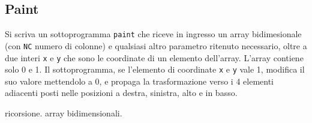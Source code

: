 \subsection{Paint}
Si scriva un sottoprogramma \texttt{paint} che riceve in ingresso un array bidimesionale (con \texttt{NC} numero di colonne) e qualsiasi altro parametro ritenuto necessario, oltre a due interi \texttt{x} e \texttt{y} che sono le coordinate di un elemento dell'array. L'array contiene solo 0 e 1. 
Il sottoprogramma, se l'elemento di coordinate \texttt{x} e \texttt{y} vale 1, modifica il suo valore mettendolo a 0, e propaga la trasformazione verso i 4 elementi adiacenti posti nelle posizioni a destra, sinistra, alto e in basso.

\begin{tags}
ricorsione. array bidimensionali.
\end{tags}


